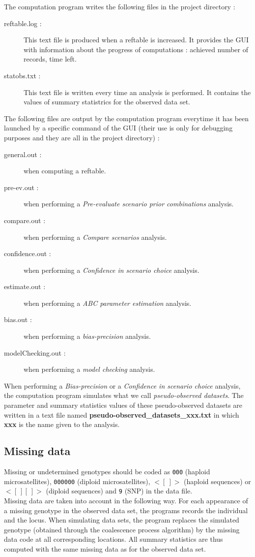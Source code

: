 The computation program writes the following files in the project
directory :
\begin{description}
\item [{reftable.log :}] This text file is produced when a reftable is
increased. It provides the GUI with information about the progress
of computations : achieved number of records, time left.
\item [{statobs.txt :}] This text file is written every time an analysis
is performed. It contains the values of summary statistrics for the
observed data set.
\end{description}
The following files are output by the computation program everytime
it has been launched by a specific command of the GUI (their use is
only for debugging purposes and they are all in the project directory)
:
\begin{description}
\item [{general.out :}] when computing a reftable.
\item [{pre-ev.out :}] when performing a \textit{Pre-evaluate scenario
prior combinations} analysis.
\item [{compare.out :}] when performing a \textit{Compare scenarios} analysis.
\item [{confidence.out :}] when performing a \textit{Confidence in scenario
choice} analysis.
\item [{estimate.out :}] when performing a \textit{ABC parameter estimation}
analysis.
\item [{bias.out :}] when performing a \textit{bias-precision} analysis.
\item [{modelChecking.out :}] when performing a \textit{model checking}
analysis.
\end{description}
When performing a \textit{Bias-precision} or a \textit{Confidence
in scenario choice} analysis, the computation program simulates what
we call \textit{pseudo-observed datasets}. The parameter and summary
statistics values of these pseudo-observed datasets are written in
a text file named \textbf{pseudo-observed\_datasets\_xxx.txt} in which
\textbf{xxx} is the name given to the analysis.


\subsection{Missing data}

Missing or undetermined genotypes should be coded as \texttt{000}
(haploid microsatellites), \texttt{000000} (diploid microsatellites),
\texttt{$<[~]>$} (haploid sequences) or \texttt{$<[~][~]>$} (diploid
sequences) and \texttt{9} (SNP) in the data file. \\
 Missing data are taken into account in the following way. For each
appearance of a missing genotype in the observed data set, the programs
records the individual and the locus. When simulating data sets, the
program replaces the simulated genotype (obtained through the coalescence
process algorithm) by the missing data code at all corresponding locations.
All summary statistics are thus computed with the same missing data
as for the observed data set.

